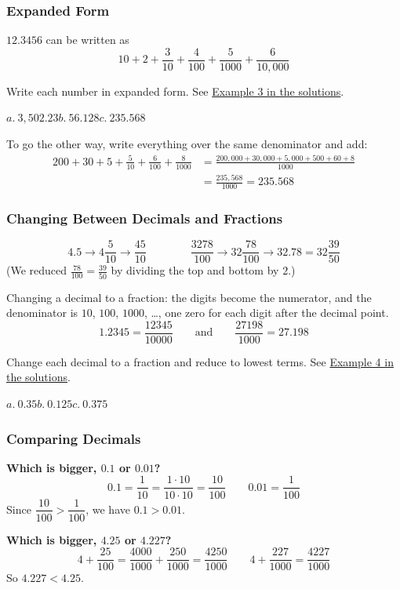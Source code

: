 \documentclass[letter]{article}
\newcommand{\exbox}[1]{\fbox{\textbf{Example #1}}}
\newcommand{\chp}{}
\newcommand{\seesol}[1]{See \hyperref[sec:\chp ex#1]{Example #1 in the solutions}.}
\begin{document}
\subsubsection*{Expanded Form}

$12.3456$ can be written as
\[10+2+\frac3{10}+\frac4{100}+\frac5{1000}+\frac6{10{,}000}\]

\exbox{3} Write each number in expanded form. \seesol{3}
\begin{center}
$a.\ 3{,}502.23$\qquad $b.\ 56.128$\qquad $c.\ 235.568$
\end{center}

To go the other way, write everything over the same denominator and add:
\[\begin{aligned}
  200+30+5+\frac5{10}+\frac6{100}+\frac8{1000}
  &=\frac{200{,}000+30{,}000+5{,}000+500+60+8}{1000}\\
  &=\frac{235{,}568}{1000}=235.568
\end{aligned}\]

\subsubsection*{Changing Between Decimals and Fractions}

\[4.5\to4\frac5{10}\to\frac{45}{10}\qquad\qquad\frac{3278}{100}\to32\frac{78}{100}\to32.78=32\frac{39}{50}\]
(We reduced $\frac{78}{100}=\frac{39}{50}$ by dividing the top and bottom by $2$.)

Changing a decimal to a fraction: the digits become the numerator, and the denominator is $10$, $100$, $1000$, \ldots, one zero for each digit after the decimal point.
\[1.2345=\frac{12345}{10000}\qquad\text{and}\qquad\frac{27198}{1000}=27.198\]

\exbox{4} Change each decimal to a fraction and reduce to lowest terms. \seesol{4}
\begin{center}
$a.\ 0.35$\qquad $b.\ 0.125$\qquad $c.\ 0.375$
\end{center}

\subsubsection*{Comparing Decimals}

\textbf{Which is bigger, $0.1$ or $0.01$?}
\[0.1=\frac1{10}=\frac{1\cdot10}{10\cdot10}=\frac{10}{100}\qquad0.01=\frac1{100}\]
Since $\dfrac{10}{100}>\dfrac1{100}$, we have $0.1>0.01$.

\textbf{Which is bigger, $4.25$ or $4.227$?}
\[4+\frac{25}{100}=\frac{4000}{1000}+\frac{250}{1000}=\frac{4250}{1000}\qquad4+\frac{227}{1000}=\frac{4227}{1000}\]
So $4.227<4.25$.
\end{document}
